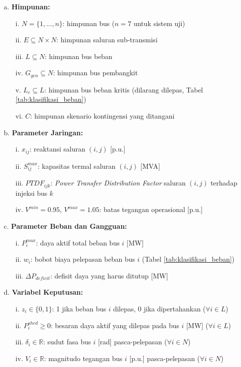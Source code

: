 \begin{enumerate}
\item[a.] \textbf{Himpunan:}
\begin{itemize}
    \item[i.] $N=\{1,...,n\}$: himpunan bus ($n=7$ untuk sistem uji)
    \item[ii.] $E\subseteq N\times N$: himpunan saluran sub-transmisi
    \item[iii.] $L\subseteq N$: himpunan bus beban
    \item[iv.] $G_{gen}\subseteq N$: himpunan bus pembangkit
    \item[v.] $L_{c}\subseteq L$: himpunan bus beban kritis (dilarang dilepas, Tabel \ref{tab:klasifikasi_beban})
    \item[vi.] $C$: himpunan skenario kontingensi yang ditangani
\end{itemize}

\item[b.] \textbf{Parameter Jaringan:}
\begin{itemize}
    \item[i.] $x_{ij}$: reaktansi saluran $(i,j)$ [p.u.]
    \item[ii.] $S_{ij}^{max}$: kapasitas termal saluran $(i,j)$ [MVA]
    \item[iii.] $PTDF_{ijk}$: \textit{Power Transfer Distribution Factor} saluran $(i,j)$ terhadap injeksi bus $k$
    \item[iv.] $V^{min}=0.95$, $V^{max}=1.05$: batas tegangan operasional [p.u.]
\end{itemize}

\item[c.] \textbf{Parameter Beban dan Gangguan:}
\begin{itemize}
    \item[i.] $P_{i}^{max}$: daya aktif total beban bus $i$ [MW]
    \item[ii.] $w_{i}$: bobot biaya pelepasan beban bus $i$ (Tabel \ref{tab:klasifikasi_beban})
    \item[iii.] $\Delta P_{deficit}$: defisit daya yang harus ditutup [MW]
\end{itemize}

\item[d.] \textbf{Variabel Keputusan:}
\begin{itemize}
    \item[i.] $z_{i}\in\{0,1\}$: 1 jika beban bus $i$ dilepas, 0 jika dipertahankan ($\forall i\in L$)
    \item[ii.] $P_{i}^{shed}\ge 0$: besaran daya aktif yang dilepas pada bus $i$ [MW] ($\forall i\in L$)
    \item[iii.] $\delta_{i}\in\mathbb{R}$: sudut fasa bus $i$ [rad] pasca-pelepasan ($\forall i\in N$)
    \item[iv.] $V_{i}\in\mathbb{R}$: magnitudo tegangan bus $i$ [p.u.] pasca-pelepasan ($\forall i\in N$)
\end{itemize}
\end{enumerate}


